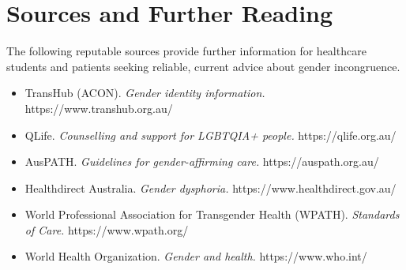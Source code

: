\section*{Sources and Further Reading}
The following reputable sources provide further information for healthcare students and patients seeking reliable, current advice about gender incongruence.
\begin{itemize}
    \item TransHub (ACON). \textit{Gender identity information.} https://www.transhub.org.au/
    \item QLife. \textit{Counselling and support for LGBTQIA+ people.} https://qlife.org.au/
    \item AusPATH. \textit{Guidelines for gender-affirming care.} https://auspath.org.au/
    \item Healthdirect Australia. \textit{Gender dysphoria.} https://www.healthdirect.gov.au/
    \item World Professional Association for Transgender Health (WPATH). \textit{Standards of Care.} https://www.wpath.org/
    \item World Health Organization. \textit{Gender and health.} https://www.who.int/
\end{itemize}
